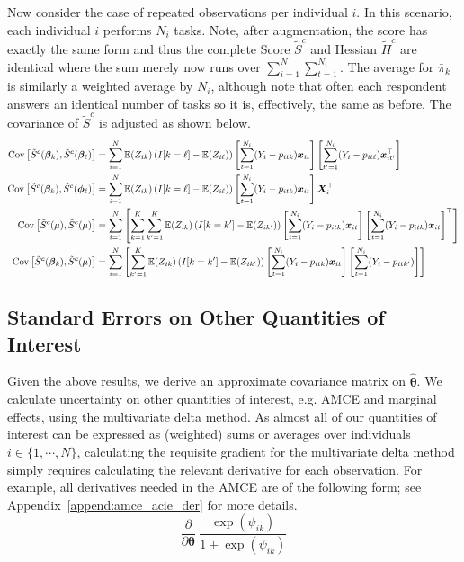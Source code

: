 Now consider the case of repeated observations per individual $i$. In
this scenario, each individual $i$ performs $N_i$ tasks. Note, after augmentation, the score has exactly the same form and thus the
complete Score $\tilde{S}^c$ and Hessian $\tilde{H}^c$ are identical
where the sum merely now runs over $\sum_{i=1}^N
\sum_{t=1}^{N_i}$. The average for $\bar{\pi}_k$ is similarly a
weighted average by $N_i$, although note that often each respondent
answers an identical number of tasks so it is, effectively, the same
as before. The covariance of $\tilde{S}^c$ is adjusted as shown
below. 
\begin{subequations}
	\begin{align*}
	\mathrm{Cov}\left[\tilde{S}^c(\bm{\beta}_k), \tilde{S}^c(\bm{\beta}_\ell)\right] &= \sum_{i=1}^N \mathbb{E}(Z_{ik})\left(I[k=\ell] - \mathbb{E}(Z_{i\ell})\right) \left[\sum_{t=1}^{N_i} (Y_i - p_{itk})\bm{x}_{it}\right]\left[\sum_{t'=1}^{N_i} (Y_i - p_{it\ell})\bm{x}_{it'}^\top\right] \\
	\mathrm{Cov}\left[\tilde{S}^c(\bm{\beta}_k), \tilde{S}^c(\bm{\phi}_\ell)\right] &= \sum_{i=1}^N \mathbb{E}(Z_{ik})\left(I[k=\ell] - \mathbb{E}(Z_{i\ell})\right) \left[\sum_{t=1}^{N_i} (Y_i - p_{itk}) \bm{x}_{it}\right]\bm{X}_i^\top \\
	\mathrm{Cov}\left[\tilde{S}^c(\mu), \tilde{S}^c(\mu)\right] &= \sum_{i=1}^N \left[\sum_{k=1}^K \sum_{k'=1}^K \mathbb{E}(Z_{ik})\left(I[k=k'] - \mathbb{E}(Z_{ik'})\right) \left[\sum_{t=1}^{N_i} (Y_i - p_{itk})\bm{x}_{it}\right]\left[\sum_{t=1}^{N_i} (Y_i - p_{itk})\bm{x}_{it}\right]^\top\right] \\
	\mathrm{Cov}\left[\tilde{S}^c(\bm{\beta}_k), \tilde{S}^c(\mu)\right] &= \sum_{i=1}^N \left[\sum_{k'=1}^K \mathbb{E}(Z_{ik})\left(I[k=k'] - \mathbb{E}(Z_{ik'})\right) \left[\sum_{t=1}^{N_i} (Y_i - p_{itk})\bm{x}_{it}\right]\left[\sum_{t=1}^{N_i} (Y_i - p_{itk'})\right]\right]
	\end{align*}
\end{subequations}

\subsection{Standard Errors on Other Quantities of Interest}\label{append:uncert_delta}

Given the above results, we derive an approximate covariance matrix on $\hat{\bm{\theta}}$. We calculate uncertainty on other quantities of interest, e.g. AMCE and marginal effects, using the multivariate delta method. As almost all of our quantities of interest can be expressed as (weighted) sums or averages over individuals $i \in \{1, \cdots, N\}$, calculating the requisite gradient for the multivariate delta method simply requires calculating the relevant derivative for each observation. For example, all derivatives needed in the AMCE are of the following form; see Appendix~\ref{append:amce_acie_der} for more details.
\begin{equation*}
\frac{\partial}{\partial \bm{\theta}}~ \frac{\exp(\psi_{ik})}{1+\exp(\psi_{ik})}
\end{equation*}

